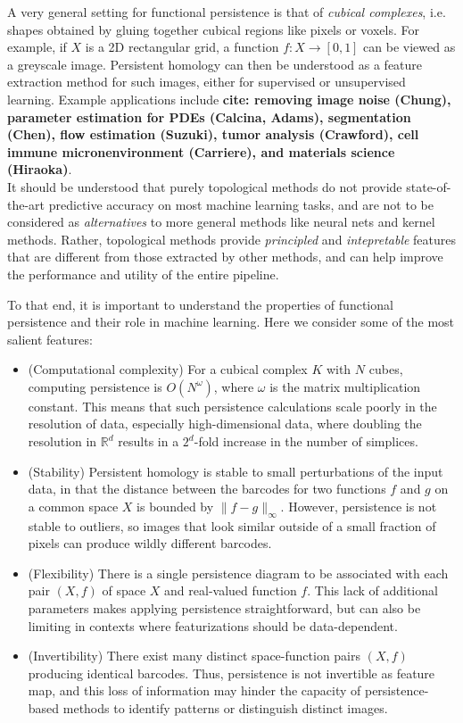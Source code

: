 \documentclass[conference]{IEEEtran}
\theoremstyle{definition}
\numberwithin{figure}{section}
\begin{document}
A very general setting for functional persistence is that of \emph{cubical complexes}, i.e. shapes obtained by gluing together cubical regions like pixels or voxels. For example, if $X$ is a 2D rectangular grid, a function $f:X \to [0,1]$ can be viewed as a greyscale image. Persistent homology can then be understood as a feature extraction method for such images, either for supervised or unsupervised learning. Example applications include {\bf cite: removing image noise (Chung), parameter estimation for PDEs (Calcina, Adams), segmentation (Chen), flow estimation (Suzuki), tumor analysis (Crawford), cell immune micronenvironment (Carriere), and materials science (Hiraoka)}.\\

It should be understood that purely topological methods do not provide state-of-the-art predictive accuracy on most machine learning tasks, and are not to be considered as \emph{alternatives} to more general methods like neural nets and kernel methods. Rather, topological methods provide \emph{principled} and \emph{intepretable} features that are different from those extracted by other methods, and can help improve the performance and utility of the entire pipeline.

To that end, it is important to understand the properties of functional persistence and their role in machine learning. Here we consider some of the most salient features:
\begin{itemize}
	\item (Computational complexity) For a cubical complex $K$ with $N$ cubes, computing persistence is $O(N^\omega)$, where $\omega$ is the matrix multiplication constant. This means that such persistence calculations scale poorly in the resolution of data, especially high-dimensional data, where doubling the resolution in $\mathbb{R}^d$ results in a $2^{d}$-fold increase in the number of simplices.
	\item (Stability) Persistent homology is stable to small perturbations of the input data, in that the distance between the barcodes for two functions $f$ and $g$ on a common space $X$ is bounded by $\|f-g\|_{\infty}$. However, persistence is not stable to outliers, so images that look similar outside of a small fraction of pixels can produce wildly different barcodes.
	\item (Flexibility) There is a single persistence diagram to be associated with each pair $(X,f)$ of space $X$ and real-valued function $f$. This lack of additional parameters makes applying persistence straightforward, but can also be limiting in contexts where featurizations should be data-dependent. 
	\item (Invertibility) There exist many distinct space-function pairs $(X,f)$ producing identical barcodes. Thus, persistence is not invertible as feature map, and this loss of information may hinder the capacity of persistence-based methods to identify patterns or distinguish distinct images.
\end{itemize}
\end{document}
